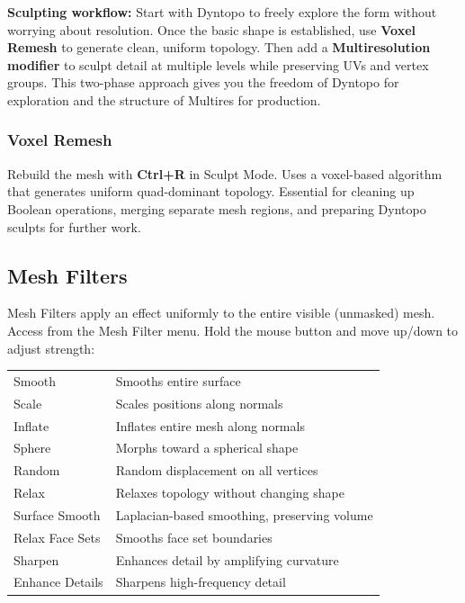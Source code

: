\begin{tipbox}
\textbf{Sculpting workflow:} Start with Dyntopo to freely explore the form without worrying about resolution. Once the basic shape is established, use \textbf{Voxel Remesh} to generate clean, uniform topology. Then add a \textbf{Multiresolution modifier} to sculpt detail at multiple levels while preserving UVs and vertex groups. This two-phase approach gives you the freedom of Dyntopo for exploration and the structure of Multires for production.
\end{tipbox}

\subsubsection{Voxel Remesh}

Rebuild the mesh with \textbf{Ctrl+R} in Sculpt Mode. Uses a voxel-based algorithm that generates uniform quad-dominant topology. Essential for cleaning up Boolean operations, merging separate mesh regions, and preparing Dyntopo sculpts for further work.

\subsection{Mesh Filters}
\label{sec:meshfilters}

Mesh Filters apply an effect uniformly to the entire visible (unmasked) mesh. Access from the Mesh Filter menu. Hold the mouse button and move up/down to adjust strength:

\begin{center}
\begin{tabularx}{\textwidth}{L{3.5cm}X}
\toprule
{}
 &  \\
\midrule
Smooth & Smooths entire surface \\
Scale & Scales positions along normals \\
Inflate & Inflates entire mesh along normals \\
Sphere & Morphs toward a spherical shape \\
Random & Random displacement on all vertices \\
Relax & Relaxes topology without changing shape \\
Surface Smooth & Laplacian-based smoothing, preserving volume \\
Relax Face Sets & Smooths face set boundaries \\
Sharpen & Enhances detail by amplifying curvature \\
Enhance Details & Sharpens high-frequency detail \\
\bottomrule
\end{tabularx}
\end{center}

